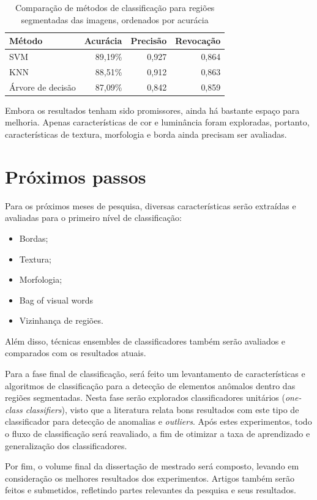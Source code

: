 \begin{table}[h]
\ABNTEXfontereduzida
\centering
\begin{tabulary}{\linewidth}{|L|R|R|R|}
\hline
\textbf{Método} & \textbf{Acurácia} & \textbf{Precisão} & \textbf{Revocação} \\ \hline
SVM               & 89,19\% & 0,927 & 0,864 \\ \hline
KNN               & 88,51\% & 0,912 & 0,863 \\ \hline
Árvore de decisão & 87,09\% & 0,842 & 0,859 \\ \hline
\end{tabulary}
\caption{Comparação de métodos de classificação para regiões segmentadas das imagens, ordenados por acurácia}
\label{tab:experimentoClassificacao1}
\end{table}

Embora os resultados tenham sido promissores, ainda há bastante espaço para melhoria. Apenas características de cor e luminância foram exploradas, portanto, características de textura, morfologia e borda ainda precisam ser avaliadas.

\section{Próximos passos}

Para os próximos meses de pesquisa, diversas características serão extraídas e avaliadas para o primeiro nível de classificação:

\begin{itemize}
	\item Bordas;
	\item Textura;
	\item Morfologia;
	\item Bag of visual words
	\item Vizinhança de regiões.
\end{itemize}

Além disso, técnicas ensembles de classificadores também serão avaliados e comparados com os resultados atuais.

Para a fase final de classificação, será feito um levantamento de características e algoritmos de classificação para a detecção de elementos anômalos dentro das regiões segmentadas. Nesta fase serão explorados classificadores unitários (\textit{one-class classifiers}), visto que a literatura relata bons resultados com este tipo de classificador para detecção de anomalias e \textit{outliers}. Após estes experimentos, todo o fluxo de classificação será reavaliado, a fim de otimizar a taxa de aprendizado e generalização dos classificadores.

Por fim, o volume final da dissertação de mestrado será composto, levando em consideração os melhores resultados dos experimentos. Artigos também serão feitos e submetidos, refletindo partes relevantes da pesquisa e seus resultados.
